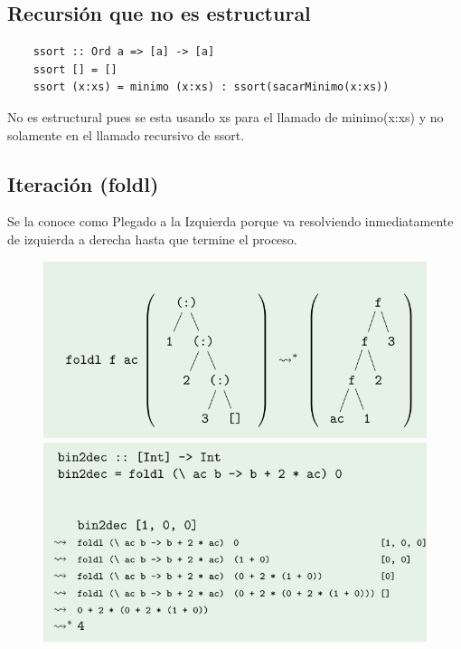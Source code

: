 \documentclass[10pt,a4paper]{article}
\begin{document}
\subsection*{Recursión que \textbf{no} es estructural}
\begin{lstlisting}
    ssort :: Ord a => [a] -> [a]
    ssort [] = []
    ssort (x:xs) = minimo (x:xs) : ssort(sacarMinimo(x:xs))
\end{lstlisting}
No es estructural pues se esta usando xs para el llamado de minimo(x:xs) y no solamente en el llamado recursivo de ssort.
\subsection*{Iteración (foldl)}
Se la conoce como Plegado a la Izquierda porque va resolviendo inmediatamente de izquierda a derecha hasta que termine el proceso. \\
\begin{figure}[h]
    \centering
    \begin{minipage}[b]{0.5\textwidth}
        \centering
        \includegraphics[width=\linewidth]{assets/foldl_grafico.png}
    \end{minipage}%
    \begin{minipage}[b]{0.5\textwidth}
        \centering
        \includegraphics[width=\linewidth]{assets/bin2dec_foldl.png}
    \end{minipage}
\end{figure}
\end{document}
